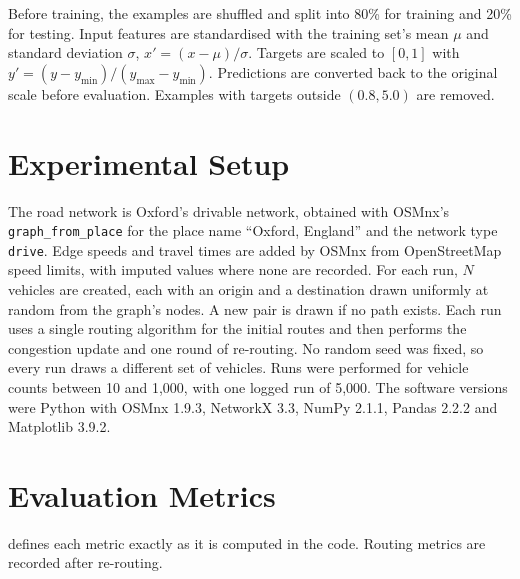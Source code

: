 \documentclass[12pt]{report}
\newcommand{\code}[1]{\texttt{#1}}
\begin{document}
Before training, the examples are shuffled and split into 80\% for training and 20\% for testing. Input features are standardised with the training set's mean $\mu$ and standard deviation $\sigma$, $x' = (x - \mu)/\sigma$. Targets are scaled to $[0, 1]$ with $y' = (y - y_{\min})/(y_{\max} - y_{\min})$. Predictions are converted back to the original scale before evaluation. Examples with targets outside $(0.8, 5.0)$ are removed.

\section{Experimental Setup}

The road network is Oxford's drivable network, obtained with OSMnx's \code{graph\_from\_place} for the place name ``Oxford, England'' and the network type \code{drive}. Edge speeds and travel times are added by OSMnx from OpenStreetMap speed limits, with imputed values where none are recorded. For each run, $N$ vehicles are created, each with an origin and a destination drawn uniformly at random from the graph's nodes. A new pair is drawn if no path exists. Each run uses a single routing algorithm for the initial routes and then performs the congestion update and one round of re-routing. No random seed was fixed, so every run draws a different set of vehicles. Runs were performed for vehicle counts between 10 and 1,000, with one logged run of 5,000. The software versions were Python with OSMnx 1.9.3, NetworkX 3.3, NumPy 2.1.1, Pandas 2.2.2 and Matplotlib 3.9.2.

\section{Evaluation Metrics}

 defines each metric exactly as it is computed in the code. Routing metrics are recorded after re-routing.
\end{document}
